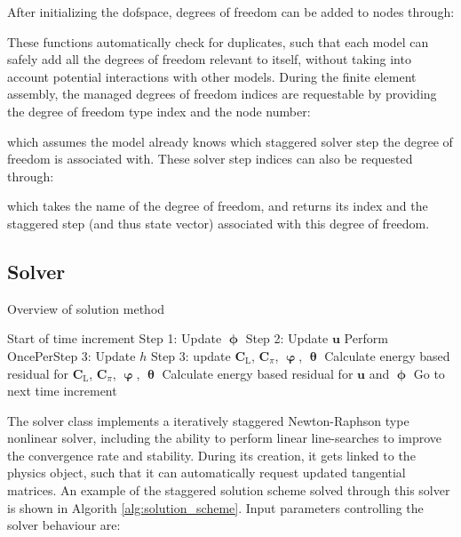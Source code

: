 \documentclass[3p]{elsarticle} %
\begin{document}
After initializing the dofspace, degrees of freedom can be added to nodes through:

These functions automatically check for duplicates, such that each model can safely add all the degrees of freedom relevant to itself, without taking into account potential interactions with other models. During the finite element assembly, the managed degrees of freedom indices are requestable by providing the degree of freedom type index and the node number:

which assumes the model already knows which staggered solver step the degree of freedom is associated with. These solver step indices can also be requested through:

which takes the name of the degree of freedom, and returns its index and the staggered step (and thus state vector) associated with this degree of freedom.

\subsection{Solver}
\begin{algorithm}[t]
\caption{Overview of solution method}\label{alg:solution_scheme}
\begin{algorithmic}[1]
\State Start of time increment
\State Step 1: Update $\bm{\upphi}$
\State Step 2: Update $\mathbf{u}$
\State Perform OncePerStep 3: Update $h$
    \State Step 3: update $\mathbf{C}_\mathrm{L}$, $\mathbf{C}_\pi$, $\bm{\upvarphi}$, $\bm{\uptheta}$
    \State Calculate energy based residual for $\mathbf{C}_\mathrm{L}$, $\mathbf{C}_\pi$, $\bm{\upvarphi}$, $\bm{\uptheta}$
\EndWhile
    \State Calculate energy based residual for $\mathbf{u}$ and $\bm{\upphi}$
\EndWhile
\State Go to next time increment
\end{algorithmic}
\end{algorithm}
The solver class implements a iteratively staggered Newton-Raphson type nonlinear solver, including the ability to perform linear line-searches to improve the convergence rate and stability. During its creation, it gets linked to the physics object, such that it can automatically request updated tangential matrices. An example of the staggered solution scheme solved through this solver is shown in Algorith \ref{alg:solution_scheme}. Input parameters controlling the solver behaviour are:

\end{document}
